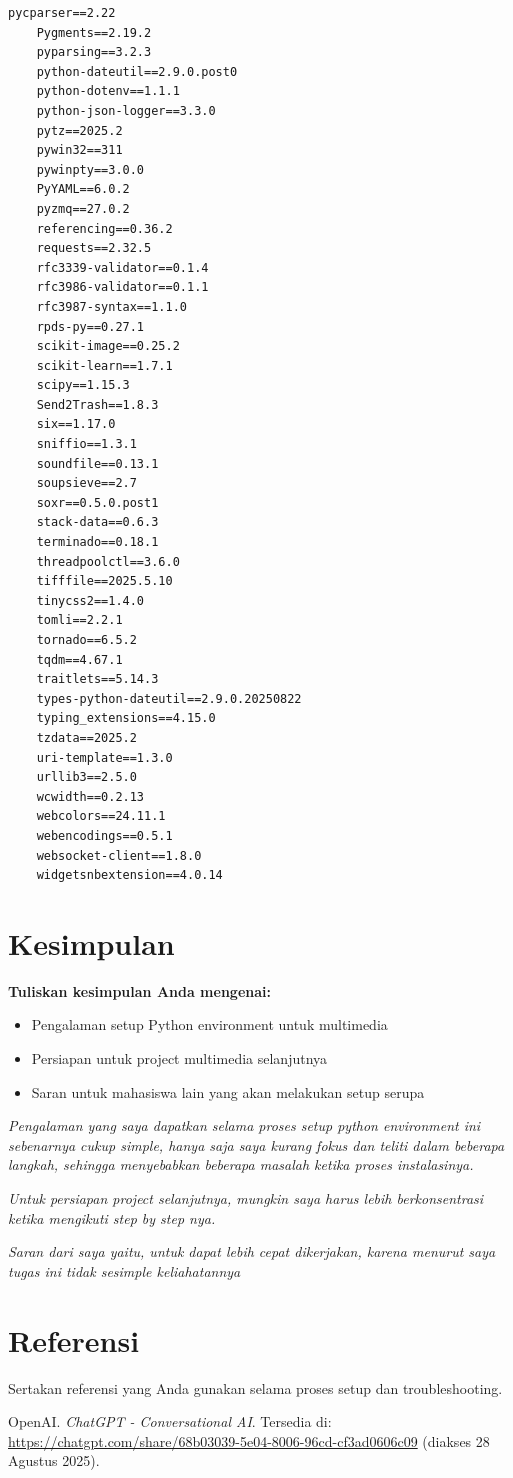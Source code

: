 \documentclass[11pt,a4paper]{article}
\begin{document}
\begin{lstlisting}[caption=Environment/Requirements file]
    pycparser==2.22
    Pygments==2.19.2
    pyparsing==3.2.3
    python-dateutil==2.9.0.post0
    python-dotenv==1.1.1
    python-json-logger==3.3.0
    pytz==2025.2
    pywin32==311
    pywinpty==3.0.0
    PyYAML==6.0.2
    pyzmq==27.0.2
    referencing==0.36.2
    requests==2.32.5
    rfc3339-validator==0.1.4
    rfc3986-validator==0.1.1
    rfc3987-syntax==1.1.0
    rpds-py==0.27.1
    scikit-image==0.25.2
    scikit-learn==1.7.1
    scipy==1.15.3
    Send2Trash==1.8.3
    six==1.17.0
    sniffio==1.3.1
    soundfile==0.13.1
    soupsieve==2.7
    soxr==0.5.0.post1
    stack-data==0.6.3
    terminado==0.18.1
    threadpoolctl==3.6.0
    tifffile==2025.5.10
    tinycss2==1.4.0
    tomli==2.2.1
    tornado==6.5.2
    tqdm==4.67.1
    traitlets==5.14.3
    types-python-dateutil==2.9.0.20250822
    typing_extensions==4.15.0
    tzdata==2025.2
    uri-template==1.3.0
    urllib3==2.5.0
    wcwidth==0.2.13
    webcolors==24.11.1
    webencodings==0.5.1
    websocket-client==1.8.0
    widgetsnbextension==4.0.14
\end{lstlisting}

\section{Kesimpulan}
\textbf{Tuliskan kesimpulan Anda mengenai:}
\begin{itemize}
    \item Pengalaman setup Python environment untuk multimedia
    \item Persiapan untuk project multimedia selanjutnya
    \item Saran untuk mahasiswa lain yang akan melakukan setup serupa
\end{itemize}

\textit{Pengalaman yang saya dapatkan selama proses setup python environment ini sebenarnya cukup simple, hanya saja saya kurang fokus dan teliti dalam beberapa langkah, sehingga menyebabkan beberapa masalah ketika proses instalasinya.}

\textit{Untuk persiapan project selanjutnya, mungkin saya harus lebih berkonsentrasi ketika mengikuti step by step nya.}

\textit{Saran dari saya yaitu, untuk dapat lebih cepat dikerjakan, karena menurut saya tugas ini tidak sesimple keliahatannya}

\section{Referensi}
Sertakan referensi yang Anda gunakan selama proses setup dan troubleshooting.

\begin{thebibliography}{9}
    OpenAI. \textit{ChatGPT - Conversational AI}. 
    Tersedia di: \url{https://chatgpt.com/share/68b03039-5e04-8006-96cd-cf3ad0606c09} (diakses 28 Agustus 2025).
\end{thebibliography}


\newpage


\end{document}
